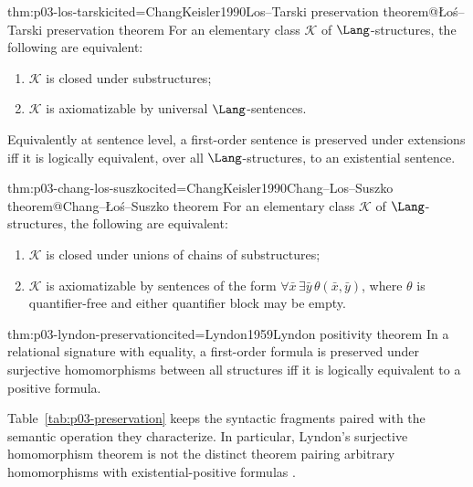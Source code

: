 \begin{hbtheorem}{thm:p03-los-tarski}{cited=ChangKeisler1990}{Los--Tarski preservation theorem@\L o\'s--Tarski preservation theorem}
For an elementary class \(\mathcal K\) of \(\Lang\)-structures, the following
are equivalent:
\begin{enumerate}
 \item \(\mathcal K\) is closed under substructures;
 \item \(\mathcal K\) is axiomatizable by universal \(\Lang\)-sentences.
\end{enumerate}
Equivalently at sentence level, a first-order sentence is preserved under
extensions iff it is logically equivalent, over all \(\Lang\)-structures, to
an existential sentence.
\end{hbtheorem}

\begin{hbtheorem}{thm:p03-chang-los-suszko}{cited=ChangKeisler1990}{Chang--Los--Suszko theorem@Chang--\L o\'s--Suszko theorem}
For an elementary class \(\mathcal K\) of \(\Lang\)-structures, the following
are equivalent:
\begin{enumerate}
 \item \(\mathcal K\) is closed under unions of chains of substructures;
 \item \(\mathcal K\) is axiomatizable by sentences of the form
       \(\forall\bar x\,\exists\bar y\,\theta(\bar x,\bar y)\), where
       \(\theta\) is quantifier-free and either quantifier block may be empty.
\end{enumerate}
\end{hbtheorem}

\begin{hbtheorem}{thm:p03-lyndon-preservation}{cited=Lyndon1959}{Lyndon positivity theorem}
In a relational signature with equality, a first-order formula is preserved
under surjective homomorphisms between all structures iff it is logically
equivalent to a positive formula.
\end{hbtheorem}

Table~\ref{tab:p03-preservation} keeps the syntactic fragments paired with the
semantic operation they characterize.  In particular, Lyndon's surjective
homomorphism theorem is not the distinct theorem pairing arbitrary
homomorphisms with existential-positive formulas
\cite{ChangKeisler1990,Lyndon1959}.


